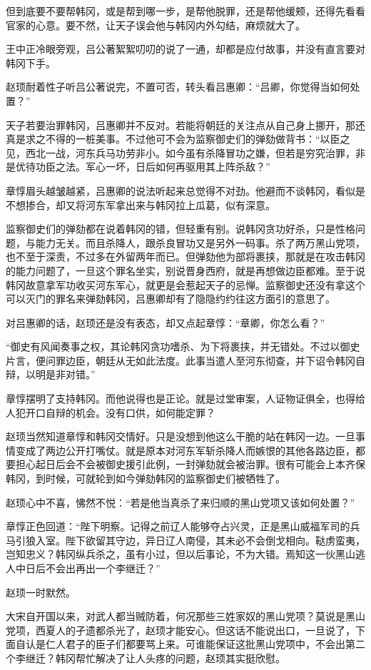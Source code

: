 但到底要不要帮韩冈，或是帮到哪一步，是帮他脱罪，还是帮他缓颊，还得先看看官家的心意。要不然，让天子误会他与韩冈内外勾结，麻烦就大了。

王中正冷眼旁观，吕公著絮絮叨叨的说了一通，却都是应付故事，并没有直言要对韩冈下手。

赵顼耐着性子听吕公著说完，不置可否，转头看吕惠卿：“吕卿，你觉得当如何处置？”

天子若要治罪韩冈，吕惠卿并不反对。若能将朝廷的关注点从自己身上挪开，那还真是求之不得的一桩美事。不过他可不会为监察御史们的弹劾做背书：“以臣之见，西北一战，河东兵马功劳非小。如今虽有杀降冒功之嫌，但若是穷究治罪，非是优待功臣之法。军心一坏，日后如何再驱用其上阵杀敌？”

章惇眉头越皱越紧，吕惠卿的说法听起来总觉得不对劲。他避而不谈韩冈，看似是不想掺合，却又将河东军拿出来与韩冈拉上瓜葛，似有深意。

监察御史们的弹劾都在说着韩冈的错，但轻重有别。说韩冈贪功好杀，只是性格问题，与能力无关。而且杀降人，跟杀良冒功又是另外一码事。杀了两万黑山党项，也不至于深责，不过多在外留两年而已。但弹劾他为部将裹挟，那就是在攻击韩冈的能力问题了，一旦这个罪名坐实，别说晋身西府，就是再想做边臣都难。至于说韩冈故意拿军功收买河东军心，就更是会惹起天子的忌惮。监察御史还没有拿这个可以灭门的罪名来弹劾韩冈，吕惠卿却有了隐隐约约往这方面引的意思了。

对吕惠卿的话，赵顼还是没有表态，却又点起章惇：“章卿，你怎么看？”

“御史有风闻奏事之权，其论韩冈贪功嗜杀、为下将裹挟，并无错处。不过以御史片言，便问罪边臣，朝廷从无如此法度。此事当遣人至河东彻查，并下诏令韩冈自辩，以明是非对错。”

章惇摆明了支持韩冈。而他说得也是正论。就是过堂审案，人证物证俱全，也得给人犯开口自辩的机会。没有口供，如何能定罪？

赵顼当然知道章惇和韩冈交情好。只是没想到他这么干脆的站在韩冈一边。一旦事情变成了两边公开打嘴仗。就是原本对河东军斩杀降人而嫉恨的其他各路边臣，都要担心起日后会不会被御史援引此例，一封弹劾就会被治罪。很有可能会上本齐保韩冈，到时候，可就轮到如今弹劾韩冈的监察御史们被牺牲了。

赵顼心中不喜，怫然不悦：“若是他当真杀了来归顺的黑山党项又该如何处置？”

章惇正色回道：“陛下明察。记得之前辽人能够夺占兴灵，正是黑山威福军司的兵马引狼入室。陛下欲留其守边，异日辽人南侵，其未必不会倒戈相向。鞑虏蛮夷，岂知忠义？韩冈纵兵杀之，虽有小过，但以后事论，不为大错。焉知这一伙黑山逃人中日后不会出再出一个李继迁？”

赵顼一时默然。

大宋自开国以来，对武人都当贼防着，何况那些三姓家奴的黑山党项？莫说是黑山党项，西夏人的孑遗都杀光了，赵顼才能安心。但这话不能说出口，一旦说了，下面自认是仁人君子的臣子们都要骂上来。可谁能保证这批黑山党项中，不会出第二个李继迁？韩冈帮忙解决了让人头疼的问题，赵顼其实挺欣慰。

